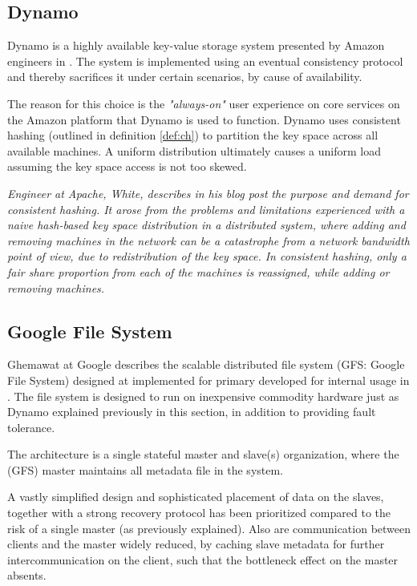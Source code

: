 \subsection*{Dynamo}
Dynamo is a highly available key-value storage system presented by Amazon engineers in \cite{DeCandia:2007:DAH:1294261.1294281}. The system is implemented using an eventual consistency protocol and thereby sacrifices it under certain scenarios, by cause of availability. 

The reason for this choice is the \textit{"always-on"} user experience on core services on the Amazon platform that Dynamo is used to function. Dynamo uses consistent hashing (outlined in definition \ref{def:ch}) to partition the key space across all available machines. A uniform distribution ultimately causes a uniform load assuming the key space access is not too skewed.
\vspace*{3mm}

\begin{definition} \label{def:ch}
\textit{Engineer at Apache, White, describes in his blog post} \cite{PageWhiteCH} \textit{the purpose and demand for consistent hashing. It arose from the problems and limitations experienced with a naive hash-based key space distribution in a distributed system, where adding and removing machines in the network can be a catastrophe from a network bandwidth point of view, due to redistribution of the key space. In consistent hashing, only a fair share proportion from each of the machines is reassigned, while adding or removing machines.}
\end{definition}

\subsection*{Google File System}
Ghemawat \etal at Google describes the scalable distributed file system (GFS: Google File System) designed at implemented for primary developed for internal usage in \cite{Ghemawat:2003:GFS:945445.945450}. The file system is designed to run on inexpensive commodity hardware just as \eg Dynamo explained previously in this section, in addition to providing fault tolerance. 

The architecture is a single stateful master and slave(s) organization, where the (GFS) master maintains all metadata file in the system. 
\newline

A vastly simplified design and sophisticated placement of data on the slaves, together with a strong recovery protocol has been prioritized compared to the risk of a single master (as previously explained). Also are communication between clients and the master widely reduced, by caching slave metadata for further intercommunication on the client, such that the bottleneck effect on the master absents.
\vspace*{3mm}

